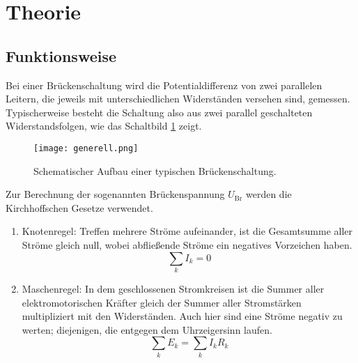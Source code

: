 \section{Theorie}
\label{sec:Theorie}

\subsection{Funktionsweise}
    Bei einer Brückenschaltung wird die Potentialdifferenz von zwei 
    parallelen Leitern, die jeweils mit unterschiedlichen Widerständen 
    versehen sind, gemessen.\\
    Typischerweise besteht die Schaltung also aus zwei parallel geschalteten 
    Widerstandsfolgen, wie das Schaltbild \ref{fig:schalt_generell}
    zeigt.\\

    \begin{figure}
        \centering
        \texttt{[image: generell.png]}
        \caption{Schematischer Aufbau einer typischen Brückenschaltung.}
        \label{fig:schalt_generell}
    \end{figure}
    \FloatBarrier

    \noindent Zur Berechnung der sogenannten Brückenspannung $U_{\text{Br}}$
    werden die Kirchhoffschen Gesetze verwendet.\\
    \begin{enumerate}
        \item Knotenregel: Treffen mehrere Ströme aufeinander, ist die Gesamtsumme
        aller Ströme gleich null, wobei abfließende Ströme ein negatives Vorzeichen
        haben.\\
        \begin{equation}
            \sum_k I_k = 0
            \label{eqn:knoten}
        \end{equation}
        \item Maschenregel: In dem geschlossenen Stromkreisen ist die Summer
        aller elektromotorischen Kräfter gleich der Summer aller Stromstärken 
        multipliziert mit den Widerständen. Auch hier sind eine Ströme negativ 
        zu werten; diejenigen, die entgegen dem Uhrzeigersinn laufen.\\
        \begin{equation}
            \sum_k E_k = \sum_k I_k R_k
            \label{eqn:maschen}
        \end{equation}
    \end{enumerate}

